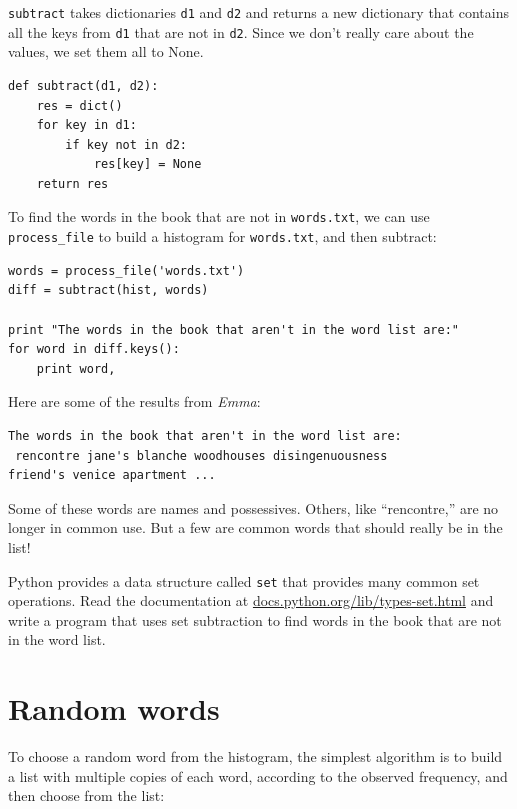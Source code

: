 \documentclass[10pt]{book}
\begin{document}
{{\tt subtract} takes dictionaries {\tt d1} and {\tt d2} and returns a
new dictionary that contains all the keys from {\tt d1} that are not
in {\tt d2}.  Since we don't really care about the values, we
set them all to None.

\beforeverb
\begin{verbatim}
def subtract(d1, d2):
    res = dict()
    for key in d1:
        if key not in d2:
            res[key] = None
    return res
\end{verbatim}
\afterverb
%
To find the words in the book that are not in {\tt words.txt},
we can use \verb"process_file" to build a histogram for
{\tt words.txt}, and then subtract:

\beforeverb
\begin{verbatim}
words = process_file('words.txt')
diff = subtract(hist, words)

print "The words in the book that aren't in the word list are:"
for word in diff.keys():
    print word,
\end{verbatim}
\afterverb
%
Here are some of the results from {\em Emma}:

\beforeverb
\begin{verbatim}
The words in the book that aren't in the word list are:
 rencontre jane's blanche woodhouses disingenuousness 
friend's venice apartment ...
\end{verbatim}
\afterverb
%
Some of these words are names and possessives.  Others, like
``rencontre,'' are no longer in common use.  But a few are common
words that should really be in the list!

\begin{ex}


Python provides a data structure called {\tt set} that provides many
common set operations.  Read the documentation at
\url{docs.python.org/lib/types-set.html} and write a program
that uses set subtraction to find words in the book that are not in
the word list.
\end{ex}


\section{Random words}
\label{randomwords}


To choose a random word from the histogram, the simplest algorithm
is to build a list with multiple copies of each word, according
to the observed frequency, and then choose from the list:

}
\end{document}
